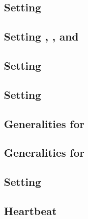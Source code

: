 \subsection{Setting \ecdataTotalSize{}}                                     \label{ec data: setting total size}                                 
\subsection{Setting \ct{}, \maxCt{}, \isSmallPoint{} and \isLargePoint{}}   \label{ec data: setting ct, ct_max, is_large, is_small}             
\subsection{Setting \accPairings{}}                                         \label{ec data: setting acc pairings}                               
\subsection{Setting \internalChecksPassed{}}                                \label{ec data: setting internal checks have passed}                
\subsection{Generalities for \membershipTestRequired{}}                     \label{ec data: generalities for G2 membership test}                
\subsection{Generalities for \acceptablePairOfPoints{}}                     \label{ec data: generalities for acceptable pairs of points}        
\subsection{Setting \trivialPairing{}}                                      \label{ec data: setting trivial pairing}                            

\subsection{Heartbeat}                                                      \label{ec data: heartbeat}                                          
